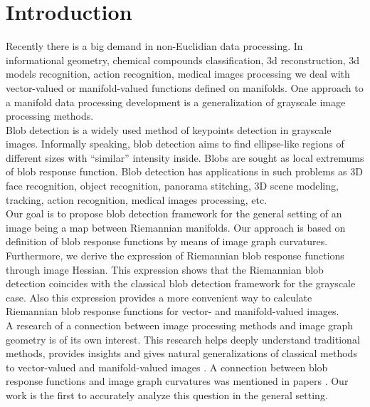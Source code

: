 \documentclass{llncs}
\begin{document}
\section{Introduction}
%
Recently there is a big demand in non-Euclidian data processing. In informational geometry, chemical compounds classification, 3d reconstruction, 3d models recognition, action recognition, medical images processing we deal with vector-valued or manifold-valued functions defined on manifolds. One approach to a manifold data processing development is a generalization of grayscale image processing methods. 
\\
Blob detection \cite{blob} is a widely used method of keypoints detection in grayscale images. Informally speaking, blob detection aims to find ellipse-like regions of different sizes with “similar” intensity inside. Blobs are sought as local extremums of blob response function. Blob detection has applications in such problems as 3D face recognition, object recognition, panorama stitching, 3D scene modeling, tracking, action recognition, medical images processing, etc.
\\
Our goal is to propose blob detection framework for the general setting of an image being a map between Riemannian manifolds. Our approach is based on definition of blob response functions by means of image graph curvatures. Furthermore, we derive the expression of Riemannian blob response functions through image Hessian. This expression shows that the Riemannian blob detection coincides with the classical blob detection framework for the grayscale case. Also this expression provides a more convenient way to calculate Riemannian blob response functions for vector- and manifold-valued images.
\\
A research of a connection between image processing methods and image graph geometry is of its own interest. This research helps deeply understand traditional methods, provides insights and gives natural generalizations of classical methods to vector-valued and manifold-valued images \cite{Saucan,Kimmel,Batard}. A connection between blob response functions and image graph curvatures was mentioned in papers \cite{BlobCurv1,BlobCurv2}. Our work is the first to accurately analyze this question in the general setting.
\end{document}
